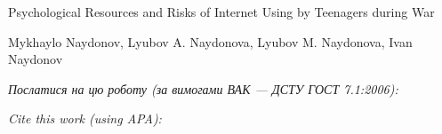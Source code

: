 \documentclass[a4paper,14pt]{extarticle}
\newcommand{\articleTitleUkr}{
Psychological Resources and Risks of Internet Using by Teenagers during War}
\newcommand{\authorFullNameUkr}{Mykhaylo Naydonov, Lyubov A. Naydonova, Lyubov M. Naydonova, Ivan Naydonov}
\begin{document}
\begin{center}\bf
\par\MakeUppercase\articleTitleUkr
\par\authorFullNameUkr
\end{center}

\par\bigskip\textit{Послатися на цю роботу (за вимогами ВАК --- ДСТУ ГОСТ 7.1:2006):}
\par{}
\par\bigskip\textit{Cite this work (using APA):}
\par{}

\end{document}
